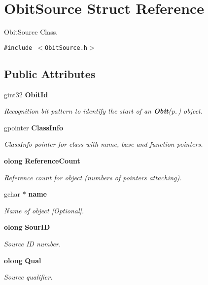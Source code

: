 \section{Obit\-Source Struct Reference}
\label{structObitSource}
Obit\-Source Class.  


{\tt \#include $<$Obit\-Source.h$>$}

\subsection*{Public Attributes}
\begin{CompactItemize}
\item 
gint32 {\bf Obit\-Id}
\begin{CompactList}\small\item\em Recognition bit pattern to identify the start of an {\bf Obit}{\rm (p.\,\pageref{structObit})} object. \item\end{CompactList}\item 
gpointer {\bf Class\-Info}
\begin{CompactList}\small\item\em Class\-Info pointer for class with name, base and function pointers. \item\end{CompactList}\item 
{\bf olong} {\bf Reference\-Count}
\begin{CompactList}\small\item\em Reference count for object (numbers of pointers attaching). \item\end{CompactList}\item 
gchar $\ast$ {\bf name}
\begin{CompactList}\small\item\em Name of object [Optional]. \item\end{CompactList}\item 
{\bf olong} {\bf Sour\-ID}
\begin{CompactList}\small\item\em Source ID number. \item\end{CompactList}\item 
{\bf olong} {\bf Qual}
\begin{CompactList}\small\item\em Source qualifier. \item\end{CompactList}\item 

\end{CompactItemize}
